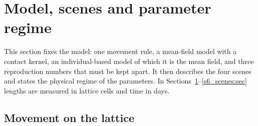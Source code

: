 \section{Model, scenes and parameter regime}\label{s2_model:sec}

This section fixes the model: one movement rule, a mean-field model with a contact kernel, an individual-based
model of which it is the mean field, and three reproduction numbers that must be kept apart. It then describes
the four scenes and states the physical regime of the parameters. In Sections~\ref{s2_model:sec}--\ref{s6_scenes:sec}
lengths are measured in lattice cells and time in days.

\subsection{Movement on the lattice}\label{s2_model:sec:movement}


